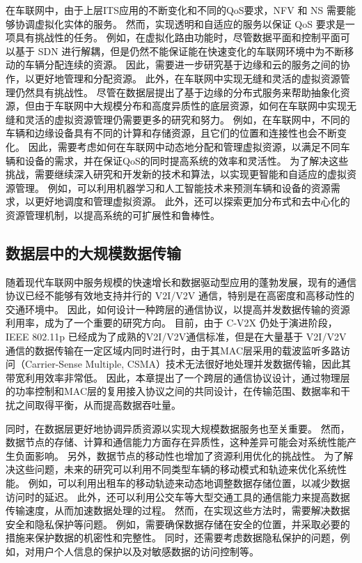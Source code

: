 在车联网中，由于上层ITS应用的不断变化和不同的QoS要求，NFV 和 NS 需要能够协调虚拟化实体的服务。
然而，实现透明和自适应的服务以保证 QoS 要求是一项具有挑战性的任务。
例如，在虚拟化路由功能时，尽管数据平面和控制平面可以基于 SDN 进行解耦，但是仍然不能保证能在快速变化的车联网环境中为不断移动的车辆分配连续的资源。
因此，需要进一步研究基于边缘和云的服务之间的协作，以更好地管理和分配资源。
此外，在车联网中实现无缝和灵活的虚拟资源管理仍然具有挑战性。
尽管在数据层提出了基于边缘的分布式服务来帮助抽象化资源，但由于车联网中大规模分布和高度异质性的底层资源，如何在车联网中实现无缝和灵活的虚拟资源管理仍需要更多的研究和努力。
例如，在车联网中，不同的车辆和边缘设备具有不同的计算和存储资源，且它们的位置和连接性也会不断变化。
因此，需要考虑如何在车联网中动态地分配和管理虚拟资源，以满足不同车辆和设备的需求，并在保证QoS的同时提高系统的效率和灵活性。
为了解决这些挑战，需要继续深入研究和开发新的技术和算法，以实现更智能和自适应的虚拟资源管理。
例如，可以利用机器学习和人工智能技术来预测车辆和设备的资源需求，以更好地调度和管理虚拟资源。
此外，还可以探索更加分布式和去中心化的资源管理机制，以提高系统的可扩展性和鲁棒性。

\subsection{数据层中的大规模数据传输}

随着现代车联网中服务规模的快速增长和数据驱动型应用的蓬勃发展，现有的通信协议已经不能够有效地支持并行的 V2I/V2V 通信，特别是在高密度和高移动性的交通环境中。
因此，如何设计一种跨层的通信协议，以提高并发数据传输的资源利用率，成为了一个重要的研究方向。
目前，由于 C-V2X 仍处于演进阶段，IEEE 802.11p 已经成为了成熟的V2I/V2V通信标准，但是在大量基于 V2I/V2V 通信的数据传输在一定区域内同时进行时，由于其MAC层采用的载波监听多路访问（Carrier-Sense Multiple, CSMA）技术无法很好地处理并发数据传输，因此其带宽利用效率非常低。
因此，本章提出了一个跨层的通信协议设计，通过物理层的功率控制和MAC层的复用接入协议之间的共同设计，在传输范围、数据率和干扰之间取得平衡，从而提高数据吞吐量。

同时，在数据层更好地协调异质资源以实现大规模数据服务也至关重要。
然而，数据节点的存储、计算和通信能力方面存在异质性，这种差异可能会对系统性能产生负面影响。
另外，数据节点的移动性也增加了资源利用优化的挑战性。
为了解决这些问题，未来的研究可以利用不同类型车辆的移动模式和轨迹来优化系统性能。
例如，可以利用出租车的移动轨迹来动态地调整数据存储位置，以减少数据访问时的延迟。
此外，还可以利用公交车等大型交通工具的通信能力来提高数据传输速度，从而加速数据处理的过程。
然而，在实现这些方法时，需要解决数据安全和隐私保护等问题。
例如，需要确保数据存储在安全的位置，并采取必要的措施来保护数据的机密性和完整性。
同时，还需要考虑数据隐私保护的问题，例如，对用户个人信息的保护以及对敏感数据的访问控制等。

